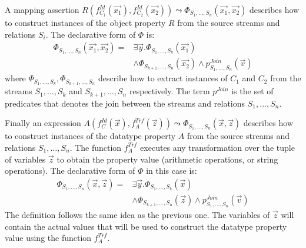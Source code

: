 A mapping assertion $R(f_{C_1}^{Id}(\vec{x_1}),f_{C_2}^{Id}(\vec{x_2})) \leadsto \Phi_{S_1,\ldots,S_n}(\vec{x_1},\vec{x_2})$ describes how to construct instances of the object property $R$ from the source streams and relations $S_i$. 
The declarative form of $\Phi$ is:
\begin{align*}
\Phi_{S_1,\ldots,S_n}(\vec{x_1},\vec{x_2})= &\exists\vec{y}.\Phi_{S_1,\ldots,S_k}(\vec{x_1}) \\
& \wedge \Phi_{S_{k+1},\ldots,S_n}(\vec{x_2}) \wedge p_{S_1,\ldots,S_n}^{Join}(\vec{v})
%
\end{align*}
where $\Phi_{S_1,\ldots,S_k}, \Phi_{S_{k+1},\ldots,S_n}$ describe how to extract instances of $C_1$ and $C_2$ from the streams $S_1,\ldots,S_k$ and $S_{k+1},\ldots,S_n$ respectively. 
The term $p^{Join}$ is the set of predicates that denotes the join between the streams and relations $S_1,\ldots,S_n$.

Finally an expression $A(f_C^{Id}(\vec{x}),f_A^{Trf}(\vec{z})) \leadsto \Phi_{S_1,\ldots,S_n}(\vec{x},\vec{z})$ describes how to construct instances of the datatype property $A$ from the source streams and relations $S_1,\ldots,S_n$. 
The function $f_A^{Trf}$ executes any transformation over the tuple of variables $\vec{z}$ to obtain the property value (\eg arithmetic operations, or string operations). 
The declarative form of $\Phi$ in this case is:
\begin{align*}
\Phi_{S_1,\ldots,S_n}(\vec{x},\vec{z})= &\exists\vec{y}.\Phi_{S_1,\ldots,S_k}(\vec{x})  \\
&\wedge \Phi_{S_{k+1},\ldots,S_n}(\vec{z}) \wedge p_{S_1,\ldots,S_n}^{Join}(\vec{v})
%
\end{align*}
The definition follows the same idea as the previous one. 
The variables of $\vec{z}$ will contain the actual values that will be used to construct the datatype property value using the function $f_A^{Trf}$.

